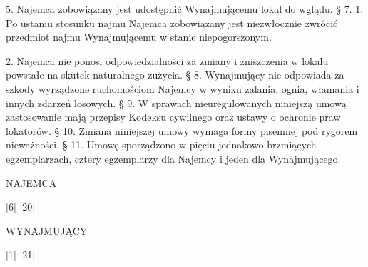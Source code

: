 \documentclass[a4paper,11pt, notitlepage]{article}
\begin{document}
    5. Najemca zobowiązany jest udostępnić Wynajmującemu lokal do wglądu.
§ 7.
    1. Po ustaniu stosunku najmu Najemca zobowiązany jest niezwłocznie zwrócić przedmiot najmu Wynajmującemu w stanie niepogorszonym.
 	
    2. Najemca nie ponosi odpowiedzialności za zmiany i zniszczenia w 	lokalu powstałe na skutek naturalnego zużycia.
§ 8.
Wynajmujący nie odpowiada za szkody wyrządzone ruchomościom Najemcy w wyniku zalania, ognia, włamania i innych zdarzeń losowych.
§ 9.
W sprawach nieuregulowanych niniejszą umową zastosowanie mają przepisy Kodeksu cywilnego oraz ustawy o ochronie praw lokatorów.
§ 10.
Zmiana niniejszej umowy wymaga formy pisemnej pod rygorem nieważności.
§ 11.
Umowę sporządzono w pięciu jednakowo brzmiących egzemplarzach, cztery egzemplarzy dla Najemcy i jeden dla Wynajmującego.

NAJEMCA


[6] [20]


WYNAJMUJĄCY


[1] [21]
\end{document}
